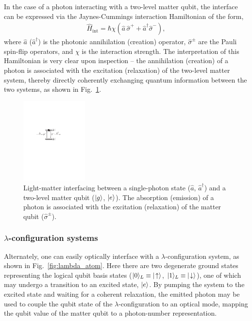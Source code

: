 In the case of a photon interacting with a two-level matter qubit, the interface can be expressed via the Jaynes-Cummings interaction Hamiltonian of the form,
\begin{align} \label{eq:two_level_hamil}
\hat{H}_\mathrm{int} = \hbar \chi (\hat{a}\,\hat\sigma^+ + \hat{a}^\dag\hat\sigma^-),
\end{align}
where $\hat{a}$ ($\hat{a}^\dag$) is the photonic annihilation (creation) operator, $\hat\sigma^\pm$ are the Pauli spin-flip operators, and $\chi$ is the interaction strength. The interpretation of this Hamiltonian is very clear upon inspection -- the annihilation (creation) of a photon is associated with the excitation (relaxation) of the two-level matter system, thereby directly coherently exchanging quantum information between the two systems, as shown in Fig.~\ref{fig:opt_int}.

\begin{figure}[htpb]
\includegraphics[width=0.3\textwidth]{opt_inter}
\caption{Light-matter interfacing between a single-photon state ($\hat{a}$, $\hat{a}^\dag$) and a two-level matter qubit ($|g\rangle$, $|e\rangle$). The absorption (emission) of a photon is associated with the excitation (relaxation) of the matter qubit ($\hat\sigma^\pm$).} \label{fig:opt_int}
\end{figure}

%
%

\subsubsection{$\lambda$-configuration systems} 

Alternately, one can easily optically interface with a $\lambda$-configuration system, as shown in Fig.~\ref{fig:lambda_atom}. Here there are two degenerate ground states representing the logical qubit basis states (\mbox{$|0\rangle_L\equiv|\!\uparrow\rangle$}, \mbox{$|1\rangle_L\equiv|\!\downarrow\rangle$}), one of which may undergo a transition to an excited state, $|e\rangle$. By pumping the system to the excited state and waiting for a coherent relaxation, the emitted photon may be used to couple the qubit state of the $\lambda$-configuration to an optical mode, mapping the qubit value of the matter qubit to a photon-number representation.

